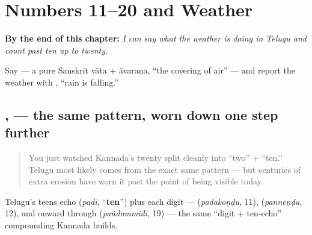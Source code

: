 
\chapter{Numbers 11–20 and Weather}
\label{ch:te-numbers-and-weather}

\begin{chapteropening}
\textbf{By the end of this chapter:} \emph{I can say what the weather is doing in Telugu and count past ten up to twenty.}

Say  — a pure Sanskrit vāta + āvaraṇa, \textquotedblleft{}the covering of air\textquotedblright{} — and report the weather with  , \textquotedblleft{}rain is falling.\textquotedblright{}
\end{chapteropening}

\section[\texorpdfstring{\te{పదకొండు} — \te{ఇరవై} (padakoṇḍu — iravai)}{పదకొండు — ఇరవై (padakoṇḍu — iravai)}]{,  — the same pattern, worn down one step further}

\label{lesson:TE-C20-padakondu-iravai}



\begin{quote}
You just watched Kannada's twenty split cleanly into \textquotedblleft{}two\textquotedblright{} + \textquotedblleft{}ten.\textquotedblright{} Telugu most likely comes from the exact same pattern — but centuries of extra erosion have worn it past the point of being visible today.
\end{quote}

\begin{cousinweb}
Telugu's teens echo \textbf{} (\emph{padi}, \textquotedblleft{}\textbf{ten}\textquotedblright{}) plus each digit — \textbf{} (\emph{padakoṇḍu}, 11), \textbf{} (\emph{panneṇḍu}, 12), and onward through \textbf{} (\emph{paṅdommidi}, 19) — the same \textquotedblleft{}digit + ten-echo\textquotedblright{} compounding Kannada builds.
\end{cousinweb}

